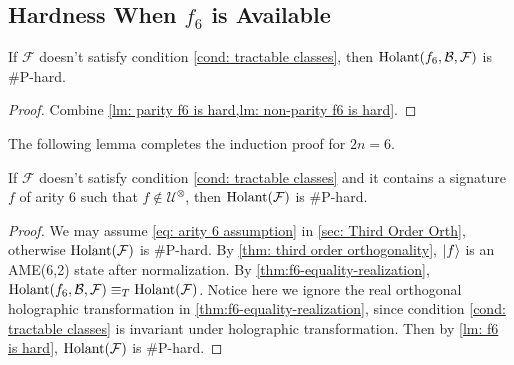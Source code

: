\subsection{Hardness When $f_6$ is Available}

\begin{lemma}\label{lm: f6 is hard}
    If $\mathcal{F}$ doesn't satisfy condition \eqref{cond: tractable classes}, then $\operatorname{Holant}(f_6,\mathcal{B},\mathcal{F})$ is \#P-hard.
\end{lemma}

\begin{proof}
    Combine \cref{lm: parity f6 is hard,lm: non-parity f6 is hard}.
\end{proof}

The following lemma completes the induction proof for $2n=6$.
\begin{lemma}\label{lm: induction 2n=6}
    If $\mathcal{F}$ doesn't satisfy condition \eqref{cond: tractable classes} and it contains a signature ${f}$ of arity $6$ such that $f\notin \mathcal{U}^\otimes$, then $\operatorname{Holant}(\mathcal{F})$ is \#P-hard.
\end{lemma}

\begin{proof}
    We may assume \eqref{eq: arity 6 assumption} in \cref{sec: Third Order Orth}, otherwise $\operatorname{Holant}(\mathcal{F})$ is \#P-hard.
    By \cref{thm: third order orthogonality}, $\ket{f}$ is an AME(6,2) state after normalization.
    By \cref{thm:f6-equality-realization}, $\operatorname{Holant}(f_6,\mathcal{B},\mathcal{F})\equiv_T \operatorname{Holant}(\mathcal{F})$.
    Notice here we ignore the real orthogonal holographic transformation in \cref{thm:f6-equality-realization}, since condition \eqref{cond: tractable classes} is invariant under holographic transformation.
    Then by \cref{lm: f6 is hard}, $\operatorname{Holant}(\mathcal{F})$ is \#P-hard.
\end{proof}



